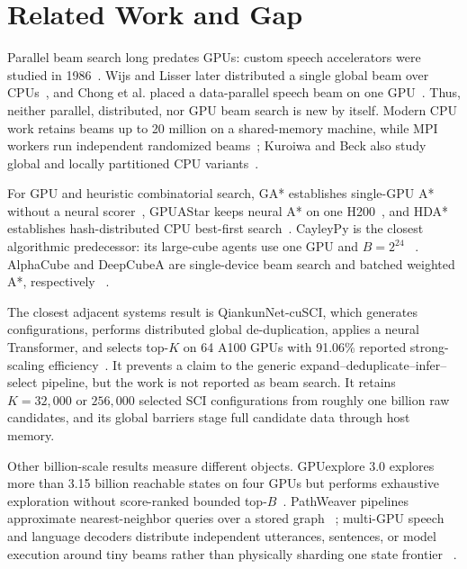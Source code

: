 \documentclass[10pt,twocolumn]{article}
\begin{document}
\section{Related Work and Gap}
Parallel beam search long predates GPUs: custom speech accelerators were studied
in 1986~\cite{anantharaman1986accelerator}.  Wijs and Lisser later distributed a
single global beam over CPUs~\cite{wijs2007distributed}, and Chong et al. placed
a data-parallel speech beam on one GPU~\cite{chong2008lvcsr}.  Thus, neither
parallel, distributed, nor GPU beam search is new by itself.  Modern CPU work
retains beams up to 20 million on a shared-memory machine, while MPI workers run
independent randomized beams~\cite{frohner2022parallel}; Kuroiwa and Beck also
study global and locally partitioned CPU variants~\cite{kuroiwa2024parallel}.

For GPU and heuristic combinatorial search, GA* establishes single-GPU A*
without a neural scorer~\cite{zhou2015gpuastar}, GPUAStar keeps neural A* on one
H200~\cite{soltani2026gpuastar}, and HDA* establishes hash-distributed CPU
best-first search~\cite{kishimoto2013hda}.  CayleyPy is the closest algorithmic
predecessor: its large-cube agents use one GPU and $B=2^{24}$
~\cite{chervov2025large,soibelman2025cayleypy}.  AlphaCube and DeepCubeA are
single-device beam search and batched weighted A*, respectively
~\cite{takano2023alphacube,agostinelli2019deepcubea}.

The closest adjacent systems result is QiankunNet-cuSCI, which generates
configurations, performs distributed global de-duplication, applies a neural
Transformer, and selects top-$K$ on 64 A100 GPUs with 91.06\% reported
strong-scaling efficiency~\cite{sun2026cunnqssci}.  It prevents a claim to the
generic expand--deduplicate--infer--select pipeline, but the work is not
reported as beam search.  It retains $K=32{,}000$ or $256{,}000$ selected SCI
configurations from roughly one billion raw candidates, and its global barriers
stage full candidate data through host memory.

Other billion-scale results measure different objects.  GPUexplore 3.0 explores
more than 3.15 billion reachable states on four GPUs but performs exhaustive
exploration without score-ranked bounded top-$B$~\cite{wijs2024gpuexplore}.  PathWeaver
pipelines approximate nearest-neighbor queries over a stored graph
~\cite{kim2025pathweaver}; multi-GPU speech and language decoders distribute
independent utterances, sentences, or model execution around tiny beams rather
than physically sharding one state frontier
~\cite{junczysdowmunt2016marian,braun2020gpuasr,chan2025trie}.
\end{document}
